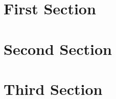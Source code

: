 \documentclass[fleqn, bachelor,subf,12pt,notitlepage]{article}
\renewcommand{\contentsname}{My Custom Table of Contents}
\begin{document}
\renewcommand{\contentsname}{My Custom Table of Contents}

\tableofcontents

\section{First Section}
\section{Second Section}
\section{Third Section}
\end{document}
